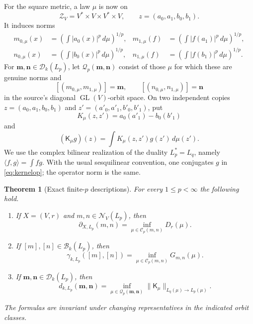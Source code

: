 \documentclass[11pt]{article}
\newtheorem{theorem}{Theorem}
\newcommand{\GL}{\operatorname{GL}}
\begin{document}
For the square metric, a law $\mu$ is now on
\[
 \mathcal Z_V=V^*\times V\times V^*\times V,
 \qquad z=(a_0,a_1,b_0,b_1).
\]
It induces norms
\begin{align*}
 m_{0,\mu}(x)&=\left(\int|a_0(x)|^p\,d\mu\right)^{1/p},&
 m_{1,\mu}(f)&=\left(\int|f(a_1)|^p\,d\mu\right)^{1/p},\\
 n_{0,\mu}(x)&=\left(\int|b_0(x)|^p\,d\mu\right)^{1/p},&
 n_{1,\mu}(f)&=\left(\int|f(b_1)|^p\,d\mu\right)^{1/p}.
\end{align*}
For $\mathbf m,\mathbf n\in\mathcal D_k(L_p)$, let
$\mathcal Q_p(\mathbf m,\mathbf n)$ consist of those $\mu$ for which these
are genuine norms and
\[
 [(m_{0,\mu},m_{1,\mu})]=\mathbf m,
 \qquad [(n_{0,\mu},n_{1,\mu})]=\mathbf n
\]
in the source's diagonal $\GL(V)$-orbit space.  On two independent copies
$z=(a_0,a_1,b_0,b_1)$ and $z'=(a'_0,a'_1,b'_0,b'_1)$, put
\begin{equation}\label{eq:kernel}
 K_\mu(z,z')=a_0(a'_1)-b_0(b'_1)
\end{equation}
and
\begin{equation}\label{eq:kernelop}
 (\mathsf K_\mu g)(z)=\int K_\mu(z,z')g(z')\,d\mu(z').
\end{equation}
We use the complex bilinear realization of the duality
$L_p^*=L_q$, namely $\langle f,g\rangle=\int fg$.  With the usual
sesquilinear convention, one conjugates $g$ in \eqref{eq:kernelop}; the
operator norm is the same.

\begin{theorem}[Exact finite-$p$ descriptions]\label{thm:formulas}
For every $1\leq p<\infty$ the following hold.
\begin{enumerate}[label=\textup{(\alph*)}]
\item If $X=(V,r)$ and $m,n\in\mathcal N_V(L_p)$, then
\begin{equation}\label{eq:partial}
 \boxed{\displaystyle
 \partial_{X,L_p}(m,n)=\inf_{\mu\in\mathcal C_p(m,n)}D_r(\mu).}
\end{equation}
\item If $[m],[n]\in\mathcal B_k(L_p)$, then
\begin{equation}\label{eq:gamma}
 \boxed{\displaystyle
 \gamma_{k,L_p}([m],[n])=
 \inf_{\mu\in\mathcal C_p(m,n)}G_{m,n}(\mu).}
\end{equation}
\item If $\mathbf m,\mathbf n\in\mathcal D_k(L_p)$, then
\begin{equation}\label{eq:square}
 \boxed{\displaystyle
 d_{k,L_p}(\mathbf m,\mathbf n)=
 \inf_{\mu\in\mathcal Q_p(\mathbf m,\mathbf n)}
 \|\mathsf K_\mu\|_{L_q(\mu)\to L_p(\mu)}.}
\end{equation}
\end{enumerate}
The formulas are invariant under changing representatives in the indicated
orbit classes.
\end{theorem}
\end{document}
